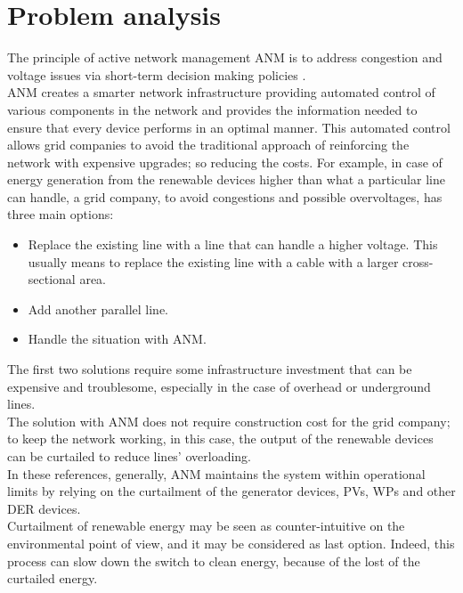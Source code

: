 \chapter{Problem analysis}
\label{chapter4}
The principle of active network management \gls{ANM} is to address congestion and voltage issues via short-term decision making policies \cite{ANMQuentin}. \\
\gls{ANM} creates a smarter network infrastructure providing automated control of various components in the network and provides the information needed to ensure that every device performs in an optimal manner. This automated control allows grid companies to avoid the traditional approach of reinforcing the network with expensive upgrades; so reducing the costs.
For example, in case of energy generation from the renewable devices higher than what a particular line can handle, a grid company, to avoid congestions and possible overvoltages, has three main options:
\begin{itemize}
    \item Replace the existing line with a line that can handle a higher voltage. This usually means to replace the existing line with a cable with a larger cross-sectional area.
    \item Add another parallel line.
    \item Handle the situation with \gls{ANM}.
\end{itemize}
The first two solutions require some infrastructure investment that can be expensive and troublesome, especially in the case of overhead or underground lines.\\
The solution with \gls{ANM} does not require construction cost for the grid company; to keep the network working, in this case, the output of the renewable devices can be curtailed to reduce lines' overloading. \\

In these references, generally, \gls{ANM} maintains the system within operational limits by relying on the curtailment of the generator devices, \glspl{PV}, \glspl{WP} and other \gls{DER} devices. \\
Curtailment of renewable energy may be seen as counter-intuitive on the environmental point of view, and it may be considered as last option. Indeed, this process can slow down the switch to clean energy, because of the lost of the curtailed energy. \\

